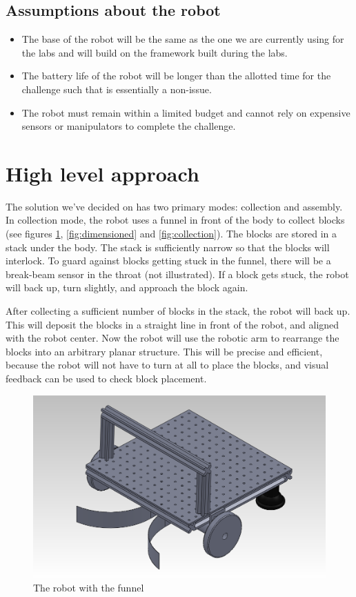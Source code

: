 \documentclass[letterpaper,11pt]{article}
\begin{document}
\subsection{Assumptions about the robot}
\begin{itemize}
 \item The base of the robot will be the same as the one we are currently using for the labs and will build on the framework built during the labs.  
 \item The battery life of the robot will be longer than the allotted time for the challenge such that is essentially a non-issue.
 \item The robot must remain within a limited budget and cannot rely on expensive sensors or manipulators to complete the challenge.
\end{itemize}

\section{High level approach}
The solution we've decided on has two primary modes: collection and assembly.
In collection mode, the robot uses a funnel in front of the body to collect blocks
(see figures \ref{fig:robotFunnel}, \ref{fig:dimensioned} and \ref{fig:collection}).
The blocks are stored in a stack under the body.
The stack is sufficiently narrow so that the blocks will interlock.
To guard against blocks getting stuck in the funnel,
there will be a break-beam sensor in the throat (not illustrated).
If a block gets stuck, the robot will back up, turn slightly, and approach the block again.

After collecting a sufficient number of blocks in the stack, the robot will back up.
This will deposit the blocks in a straight line in front of the robot, and aligned with the robot center.
Now the robot will use the robotic arm to rearrange the blocks into an arbitrary planar structure.
This will be precise and efficient, because the robot will not have to turn at all to place the blocks,
and visual feedback can be used to check block placement.
\begin{figure}[h]
 \centering
  \includegraphics[width=4.5in]{images/AssemblyIso}
\caption{The robot with the funnel}
\label{fig:robotFunnel}
\end{figure}
\end{document}
